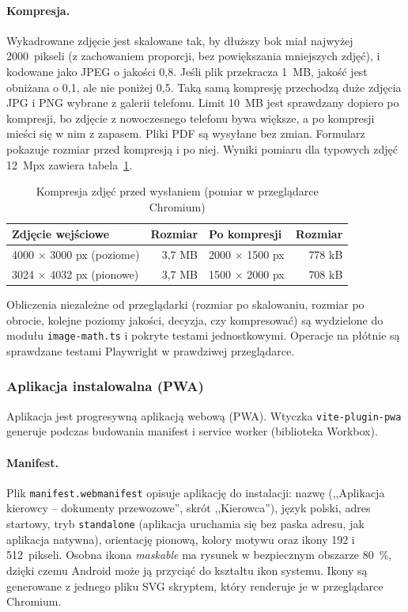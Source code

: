 \paragraph{Kompresja.} Wykadrowane zdjęcie jest skalowane tak, by dłuższy bok
miał najwyżej 2000~pikseli (z zachowaniem proporcji, bez powiększania
mniejszych zdjęć), i kodowane jako JPEG o jakości 0,8. Jeśli plik przekracza
1~MB, jakość jest obniżana o 0,1, ale nie poniżej 0,5. Taką samą kompresję
przechodzą duże zdjęcia JPG i PNG wybrane z galerii telefonu. Limit 10~MB jest
sprawdzany dopiero po kompresji, bo zdjęcie z nowoczesnego telefonu bywa
większe, a po kompresji mieści się w nim z zapasem. Pliki PDF są wysyłane bez
zmian. Formularz pokazuje rozmiar przed kompresją i po niej. Wyniki pomiaru
dla typowych zdjęć 12~Mpx zawiera tabela~\ref{tab:kompresja}.

\begin{table}[htbp]
\centering
\caption{Kompresja zdjęć przed wysłaniem (pomiar w przeglądarce Chromium)}
\label{tab:kompresja}
\small
\begin{tabular}{|l|r|l|r|}
\hline
\textbf{Zdjęcie wejściowe} & \textbf{Rozmiar} & \textbf{Po kompresji} & \textbf{Rozmiar} \\
\hline
4000 × 3000 px (poziome) & 3,7 MB & 2000 × 1500 px & 778 kB \\
\hline
3024 × 4032 px (pionowe) & 3,7 MB & 1500 × 2000 px & 708 kB \\
\hline
\end{tabular}
\par
{}
\end{table}

Obliczenia niezależne od przeglądarki (rozmiar po skalowaniu, rozmiar po
obrocie, kolejne poziomy jakości, decyzja, czy kompresować) są wydzielone do
modułu \texttt{image-math.ts} i pokryte testami jednostkowymi. Operacje na
płótnie są sprawdzane testami Playwright w prawdziwej przeglądarce.

\subsubsection{Aplikacja instalowalna (PWA)}

Aplikacja jest progresywną aplikacją webową (PWA). Wtyczka
\texttt{vite-plugin-pwa} generuje podczas budowania manifest i service worker
(biblioteka Workbox).

\paragraph{Manifest.} Plik \texttt{manifest.webmanifest} opisuje aplikację do
instalacji: nazwę (,,Aplikacja kierowcy -- dokumenty przewozowe'', skrót
,,Kierowca''), język polski, adres startowy, tryb \texttt{standalone}
(aplikacja uruchamia się bez paska adresu, jak aplikacja natywna), orientację
pionową, kolory motywu oraz ikony 192 i 512~pikseli. Osobna ikona
\emph{maskable} ma rysunek w bezpiecznym obszarze 80~\%, dzięki czemu Android
może ją przyciąć do kształtu ikon systemu. Ikony są generowane z jednego
pliku SVG skryptem, który renderuje je w przeglądarce Chromium.

